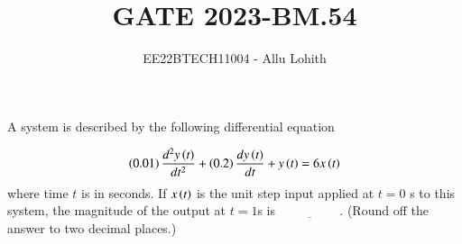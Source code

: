 \documentclass[journal,12pt,twocolumn]{IEEEtran}
\theoremstyle{remark}
\begin{document}

\vspace{3cm}

\title{GATE 2023-BM.54}
\author{EE22BTECH11004 - Allu Lohith}

\maketitle

    A system is described by the following differential equation
    
    $$\left(0.01\right) \frac{d^2y\left(t\right)}{dt^2} + \left(0.2\right)\frac{dy\left(t\right) }{dt} + y\left(t\right) = 6x\left(t\right)$$
    where time $t$ is in seconds. If $x\left(t\right)$ is the unit step input applied at $t = 0$ s to this system, the magnitude of the output at $t = 1$s is $\underline{\hspace{2cm}}$. (Round off the answer to two decimal places.)\\
    
\end{document}
